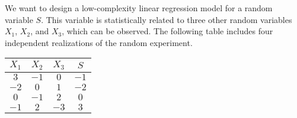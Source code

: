 \begin{solution}
\end{solution}

\else

\question We want to design a low-complexity linear regression model for a random variable $S$. This variable is statistically related to three other random variables $X_1$, $X_2$, and $X_3$, which can be observed. The following table includes four independent realizations of the random experiment.\\
 \vspace{0.1cm}
 
 \begin{center}
 \begin{tabular}{|c|c|c|c|} \hline
$X_1$&	$X_2$	&$X_3$	&$S$ \\ \hline
$3$	&$-1$ &	$0$ &	$-1$\\ \hline
$-2$ & $0$ &	$1$ &	$-2$\\ \hline
$0$ &	$-1$ &	$2$ &	$0$\\ \hline
$-1$ &	$2$	& $-3$ &	$3$\\ \hline
\end{tabular}
 \end{center}
  \vspace{0.1cm}

